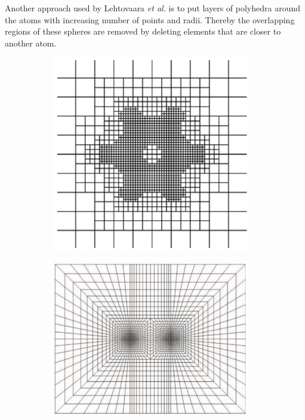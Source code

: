 Another approach used by Lehtovaara \textit{et al.} \cite{fe_dft2} is to put layers of polyhedra around the atoms with increasing number of points and radii.
Thereby the overlapping regions of these spheres are removed by deleting elements that are closer to another atom.
\begin{figure}
   \begin{subfigure}{0.24\textwidth}
   \includegraphics[width=0.95\textwidth]{Figures/QuadMeshBenzene}
   \caption{}
   \label{fig:HexBenz}
  \end{subfigure}
  \begin{subfigure}{0.24\textwidth}
   \includegraphics[width=0.95\textwidth]{Figures/QuadDiatomic}

\end{subfigure}
\end{figure}
